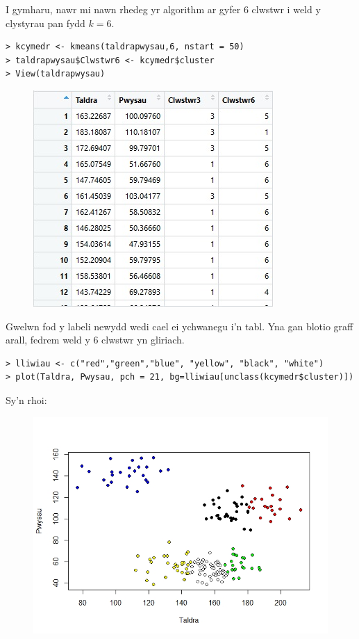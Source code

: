 I gymharu, nawr mi nawn rhedeg yr algorithm ar gyfer 6 clwstwr i weld y clystyrau pan fydd $k=6$. 

\begin{verbatim}
> kcymedr <- kmeans(taldrapwysau,6, nstart = 50)
> taldrapwysau$Clwstwr6 <- kcymedr$cluster
> View(taldrapwysau)
\end{verbatim}

\begin{figure}[H]
\begin{center}
\includegraphics[width=0.5\linewidth]{../img/Data6_yn_R.jpg}
\end{center}
\end{figure}

Gwelwn fod y labeli newydd wedi cael ei ychwanegu i'n tabl. Yna gan blotio graff arall, fedrem weld y 6 clwstwr yn gliriach.

\begin{verbatim}
> lliwiau <- c("red","green","blue", "yellow", "black", "white")
> plot(Taldra, Pwysau, pch = 21, bg=lliwiau[unclass(kcymedr$cluster)])
\end{verbatim}

Sy'n rhoi:

\begin{figure}[H]
\begin{center}
\includegraphics[width=0.5\linewidth]{../img/6clwstwrR.jpeg}
\end{center}
\end{figure}

